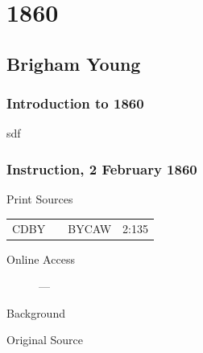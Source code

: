 \section{1860}

	\subsection{Brigham Young}
		\label{EMS-1860-BY}

		\subsubsection{Introduction to 1860}
		
			sdf
			
		\subsubsection{Instruction, 2 February 1860}
			\label{EMS-1860-BY-02-FEB-1860}
			
			\begin{description}
					\item[Print Sources]
				\end{description}

					\begin{tabular}{p{0.5in}p{1in}p{0.5in}p{1in}}
					CDBY	& 		&  BYCAW		& 2:135 \\
					\end{tabular}
				
				\begin{description}
					\item[Online Access] ---
				\end{description}
				
				\begin{description}
					\item[Background]
				\end{description}
				
					\phantom{.}
				
				\begin{description}
					\item[Original Source]
				\end{description}
				
